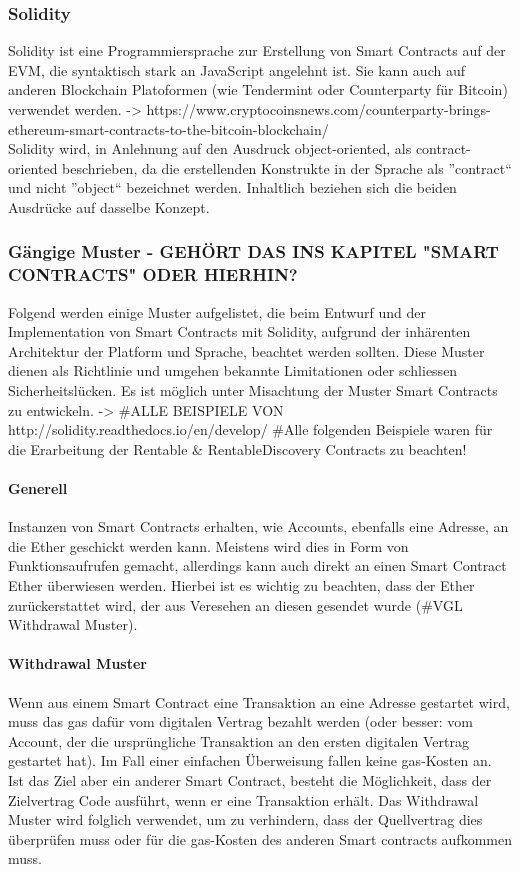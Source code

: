\subsubsection{Solidity}
Solidity ist eine Programmiersprache zur Erstellung von Smart Contracts auf der \acrfull{EVM}, die syntaktisch stark an JavaScript angelehnt ist. Sie kann auch auf anderen Blockchain Platoformen (wie Tendermint oder Counterparty für Bitcoin) verwendet werden. -> https://www.cryptocoinsnews.com/counterparty-brings-ethereum-smart-contracts-to-the-bitcoin-blockchain/\\Solidity wird, in Anlehnung auf den Ausdruck object-oriented, als contract-oriented beschrieben, da die erstellenden Konstrukte in der Sprache als ''contract`` und nicht ''object`` bezeichnet werden. Inhaltlich beziehen sich die beiden Ausdrücke auf dasselbe Konzept.

\subsubsection{Gängige Muster - GEHÖRT DAS INS KAPITEL "SMART CONTRACTS" ODER HIERHIN?}
Folgend werden einige Muster aufgelistet, die beim Entwurf und der Implementation von Smart Contracts mit Solidity, aufgrund der inhärenten Architektur der Platform und Sprache, beachtet werden sollten. Diese Muster dienen als Richtlinie und umgehen bekannte Limitationen oder schliessen Sicherheitslücken. Es ist möglich unter Misachtung der Muster Smart Contracts zu entwickeln. -> \#ALLE BEISPIELE VON http://solidity.readthedocs.io/en/develop/
\#Alle folgenden Beispiele waren für die Erarbeitung der Rentable \& RentableDiscovery Contracts zu beachten!

\paragraph{Generell}
Instanzen von Smart Contracts erhalten, wie Accounts, ebenfalls eine Adresse, an die Ether geschickt werden kann. Meistens wird dies in Form von Funktionsaufrufen gemacht, allerdings kann auch direkt an einen Smart Contract Ether überwiesen werden. Hierbei ist es wichtig zu beachten, dass der Ether zurückerstattet wird, der aus Veresehen an diesen gesendet wurde (\#VGL Withdrawal Muster).

\paragraph{Withdrawal Muster}
Wenn aus einem Smart Contract eine Transaktion an eine Adresse gestartet wird, muss das gas dafür vom digitalen Vertrag bezahlt werden (oder besser: vom Account, der die ursprüngliche Transaktion an den ersten digitalen Vertrag gestartet hat). Im Fall einer einfachen Überweisung fallen keine gas-Kosten an. Ist das Ziel aber ein anderer Smart Contract, besteht die Möglichkeit, dass der Zielvertrag Code ausführt, wenn er eine Transaktion erhält. Das Withdrawal Muster wird folglich verwendet, um zu verhindern, dass der Quellvertrag dies überprüfen muss oder für die gas-Kosten des anderen Smart contracts aufkommen muss.

